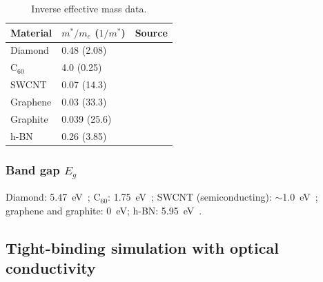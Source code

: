 \documentclass[twocolumn,showpacs,preprintnumbers,amsmath,amssymb,prb]{revtex4-2}
\begin{document}
\begin{table}[h]
\caption{Inverse effective mass data.}
\label{tab:invmass}
\begin{ruledtabular}
\begin{tabular}{lll}
  Material & $m^*/m_e$ ($1/m^*$) & Source \\
  \hline
  Diamond & 0.48 (2.08) & \cite{Ioffe} \\
  C$_{60}$ & 4.0 (0.25) & \cite{Gunnarsson1997} \\
  SWCNT & 0.07 (14.3) & \cite{Ajiki1993} \\
  Graphene & 0.03 (33.3) & \cite{Novoselov2005} \\
  Graphite & 0.039 (25.6) & \cite{Dresselhaus2002} \\
  h-BN & 0.26 (3.85) & \cite{Ioffe} \\
\end{tabular}
\end{ruledtabular}
\end{table}

\subsubsection{Band gap $E_g$}

Diamond: 5.47~eV~\cite{Clark1964}; C$_{60}$: 1.75~eV~\cite{Lof1992};
SWCNT (semiconducting): $\sim$1.0~eV~\cite{Saito1998};
graphene and graphite: 0~eV; h-BN: 5.95~eV~\cite{Cassabois2016}.

\subsection{Tight-binding simulation with optical conductivity}
\end{document}
